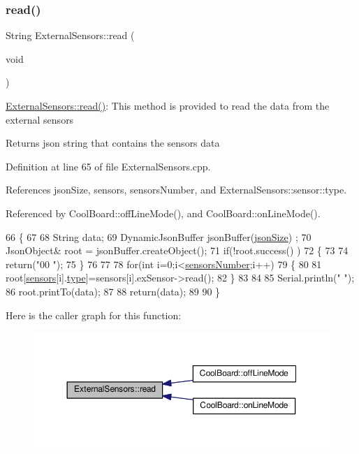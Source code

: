 \subsubsection{\texorpdfstring{read()}{read()}}
{\footnotesize\ttfamily String External\+Sensors\+::read (\begin{DoxyParamCaption}\item[{void}]{ }\end{DoxyParamCaption})}

\hyperlink{classExternalSensors_a53177b81eca3be89508b5511ddcd00fc}{External\+Sensors\+::read()}\+: This method is provided to read the data from the external sensors

\begin{DoxyReturn}{Returns}
json string that contains the sensors data 
\end{DoxyReturn}


Definition at line 65 of file External\+Sensors.\+cpp.



References json\+Size, sensors, sensors\+Number, and External\+Sensors\+::sensor\+::type.



Referenced by Cool\+Board\+::off\+Line\+Mode(), and Cool\+Board\+::on\+Line\+Mode().


\begin{DoxyCode}
66 \{
67 
68     String data;
69     DynamicJsonBuffer  jsonBuffer(\hyperlink{classExternalSensors_acacea86d74d967b57fcff282d26cff57}{jsonSize}) ;
70     JsonObject& root = jsonBuffer.createObject();
71     \textcolor{keywordflow}{if}(!root.success() )
72     \{
73 
74      \textcolor{keywordflow}{return}(\textcolor{stringliteral}{"00 "});
75     \}
76     
77 
78     \textcolor{keywordflow}{for}(\textcolor{keywordtype}{int} i=0;i<\hyperlink{classExternalSensors_a58e4fbf9adeae787d92be5fa33043b5d}{sensorsNumber};i++)
79     \{
80             
81             root[\hyperlink{classExternalSensors_a284233f884fcf00154a44740cf1d9e1e}{sensors}[i].\hyperlink{structExternalSensors_1_1sensor_a6acfdb02c742c2110d7bd2b5d9fce9e7}{type}]=sensors[i].exSensor->read();       
82     \}
83     
84 
85     Serial.println(\textcolor{stringliteral}{" "});
86     root.printTo(data);
87     
88     \textcolor{keywordflow}{return}(data);
89 
90 \}
\end{DoxyCode}
Here is the caller graph for this function\+:
\nopagebreak
\begin{figure}[H]
\begin{center}
\leavevmode
\includegraphics[width=350pt]{classExternalSensors_a53177b81eca3be89508b5511ddcd00fc_icgraph}
\end{center}
\end{figure}


